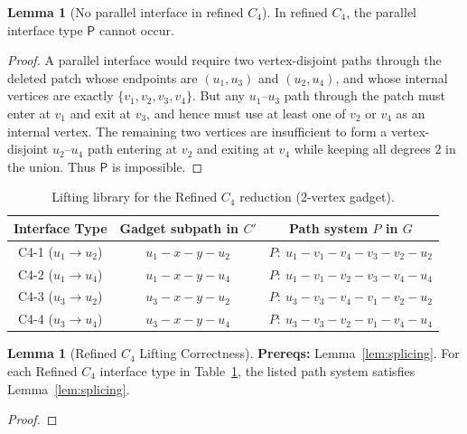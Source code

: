 \documentclass[12pt]{article}
\theoremstyle{definition}
\newtheorem{lemma}[theorem]{Lemma}
\newcommand{\RefinedCFourGadgetVertices}{2}
\begin{document}
\begin{lemma}[No parallel interface in refined $C_4$]
\label{lem:no-parallel-C4}
In refined $C_4$, the parallel interface type $\mathsf{P}$ cannot occur.
\end{lemma}

\begin{proof}
A parallel interface would require two vertex-disjoint paths through the deleted patch whose endpoints are $(u_1,u_3)$ and $(u_2,u_4)$, and whose internal vertices are exactly $\{v_1,v_2,v_3,v_4\}$.
But any $u_1$--$u_3$ path through the patch must enter at $v_1$ and exit at $v_3$, and hence must use at least one of $v_2$ or $v_4$ as an internal vertex.
The remaining two vertices are insufficient to form a vertex-disjoint $u_2$--$u_4$ path entering at $v_2$ and exiting at $v_4$ while keeping all degrees $2$ in the union.
Thus $\mathsf{P}$ is impossible.
\end{proof}

\begin{table}[ht]
\centering
\begin{tabular}{|c|c|c|}
\hline
\textbf{Interface Type} &
\textbf{Gadget subpath in $C'$} &
\textbf{Path system $P$ in $G$} \\
\hline
C4-1 ($u_1 \to u_2$) &
$u_1\!-\!x\!-\!y\!-\!u_2$ &
$P:\ u_1\!-\!v_1\!-\!v_4\!-\!v_3\!-\!v_2\!-\!u_2$\\
\hline
C4-2 ($u_1 \to u_4$) &
$u_1\!-\!x\!-\!y\!-\!u_4$ &
$P:\ u_1\!-\!v_1\!-\!v_2\!-\!v_3\!-\!v_4\!-\!u_4$\\
\hline
C4-3 ($u_3 \to u_2$) &
$u_3\!-\!x\!-\!y\!-\!u_2$ &
$P:\ u_3\!-\!v_3\!-\!v_4\!-\!v_1\!-\!v_2\!-\!u_2$\\
\hline
C4-4 ($u_3 \to u_4$) &
$u_3\!-\!x\!-\!y\!-\!u_4$ &
$P:\ u_3\!-\!v_3\!-\!v_2\!-\!v_1\!-\!v_4\!-\!u_4$\\
\hline
\end{tabular}
\caption{Lifting library for the Refined $C_4$ reduction (\RefinedCFourGadgetVertices-vertex gadget).}
\label{tab:lifting-c4}
\end{table}

\begin{lemma}[Refined $C_4$ Lifting Correctness]
\label{lem:lifting-c4}
\textbf{Prereqs:} Lemma~\ref{lem:splicing}.
For each Refined $C_4$ interface type in Table~\ref{tab:lifting-c4}, the listed path
system satisfies Lemma~\ref{lem:splicing}.
\end{lemma}

\begin{proof}
\end{proof}
\end{document}
